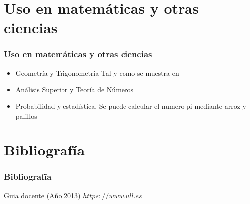 \documentclass {beamer}
\begin{document}
\section{Uso en matemáticas y otras ciencias}
\begin{frame}
\frametitle{Uso en matemáticas y otras ciencias}

\begin{itemize}

\item Geometría y Trigonometría
Tal y como se muestra en
\item Análisis Superior y Teoría de Números
\item Probabilidad y estadística.
Se puede calcular el numero pi mediante arroz y palillos \cite{Arroz}



\end{itemize}

\end{frame}

\section{Bibliografía}
\begin{frame}
\frametitle{Bibliografía}
\begin{thebibliography}{10}
\beamertemplatebookbibitems
{}
Guia docente (Año 2013)
{\small $https://www.ull.es$}

\end{thebibliography}
\end{frame}
\end{document}
